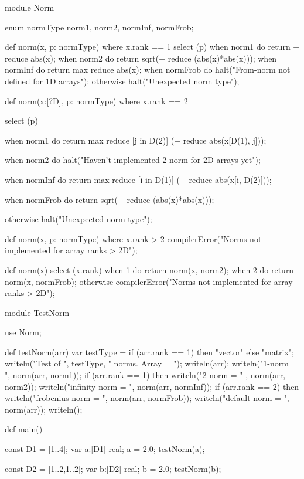\begin{numberedchapel}
module Norm{
  enum normType {norm1, norm2, normInf, normFrob};

  def norm(x, p: normType) where x.rank == 1 {
    select (p) {
      when norm1 do return + reduce abs(x);
      when norm2 do return sqrt(+ reduce (abs(x)*abs(x)));
      when normInf do return max reduce abs(x);
      when normFrob do halt("From-norm not defined for 1D arrays");
      otherwise halt("Unexpected norm type");
    }
  }

  def norm(x:[?D], p: normType) where x.rank == 2 {
    select (p) {
      when norm1 do
        return max reduce [j in D(2)] (+ reduce abs(x[D(1), j]));

      when norm2 do
        halt("Haven't implemented 2-norm for 2D arrays yet");

      when normInf do
        return max reduce [i in D(1)] (+ reduce abs(x[i, D(2)]));

      when normFrob do return sqrt(+ reduce (abs(x)*abs(x)));

      otherwise halt("Unexpected norm type");
    }
  }

  def norm(x, p: normType) where x.rank > 2 {
    compilerError("Norms not implemented for array ranks > 2D");
  }

  def norm(x) {
    select (x.rank) {
      when 1 do return norm(x, norm2);
      when 2 do return norm(x, normFrob);
      otherwise compilerError("Norms not implemented for array ranks > 2D");
    }
  }
}

module TestNorm {
  use Norm;

  def testNorm(arr) {
    var testType = if (arr.rank == 1) then "vector" else "matrix";
    writeln("Test of ", testType, " norms.  Array = ");
    writeln(arr);
    writeln("1-norm = ", norm(arr, norm1));
    if (arr.rank == 1) then
      writeln("2-norm = " , norm(arr, norm2));
    writeln("infinity norm = ", norm(arr, normInf));
    if (arr.rank == 2) then
      writeln("frobenius norm = ", norm(arr, normFrob));
    writeln("default norm = ", norm(arr));
    writeln();
  }

  def main() {
    const D1 = [1..4];
    var a:[D1] real;
    a = 2.0;
    testNorm(a);

    const D2 = [1..2,1..2];
    var b:[D2] real;
    b = 2.0;
    testNorm(b);
  }
}
\end{numberedchapel}

